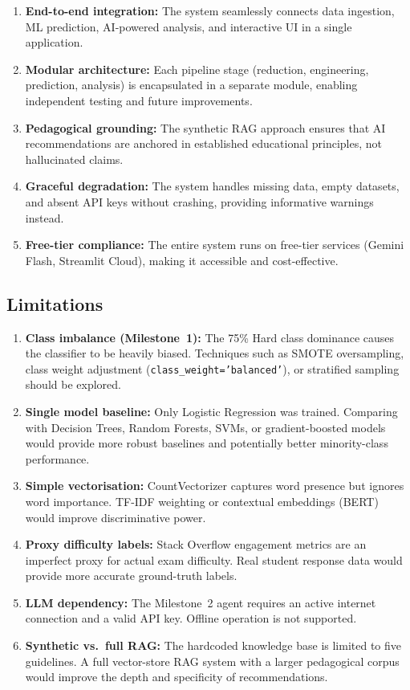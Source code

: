 \documentclass[12pt, a4paper]{article}
\begin{document}
\begin{enumerate}
    \item \textbf{End-to-end integration:} The system seamlessly connects data ingestion, ML prediction, AI-powered analysis, and interactive UI in a single application.
    \item \textbf{Modular architecture:} Each pipeline stage (reduction, engineering, prediction, analysis) is encapsulated in a separate module, enabling independent testing and future improvements.
    \item \textbf{Pedagogical grounding:} The synthetic RAG approach ensures that AI recommendations are anchored in established educational principles, not hallucinated claims.
    \item \textbf{Graceful degradation:} The system handles missing data, empty datasets, and absent API keys without crashing, providing informative warnings instead.
    \item \textbf{Free-tier compliance:} The entire system runs on free-tier services (Gemini Flash, Streamlit Cloud), making it accessible and cost-effective.
\end{enumerate}

\subsection{Limitations}

\begin{enumerate}
    \item \textbf{Class imbalance (Milestone~1):} The 75\% Hard class dominance causes the classifier to be heavily biased. Techniques such as SMOTE oversampling, class weight adjustment (\texttt{class\_weight='balanced'}), or stratified sampling should be explored.
    
    \item \textbf{Single model baseline:} Only Logistic Regression was trained. Comparing with Decision Trees, Random Forests, SVMs, or gradient-boosted models would provide more robust baselines and potentially better minority-class performance.
    
    \item \textbf{Simple vectorisation:} CountVectorizer captures word presence but ignores word importance. TF-IDF weighting or contextual embeddings (BERT) would improve discriminative power.
    
    \item \textbf{Proxy difficulty labels:} Stack Overflow engagement metrics are an imperfect proxy for actual exam difficulty. Real student response data would provide more accurate ground-truth labels.
    
    \item \textbf{LLM dependency:} The Milestone~2 agent requires an active internet connection and a valid API key. Offline operation is not supported.
    
    \item \textbf{Synthetic vs.\ full RAG:} The hardcoded knowledge base is limited to five guidelines. A full vector-store RAG system with a larger pedagogical corpus would improve the depth and specificity of recommendations.
\end{enumerate}
\end{document}
